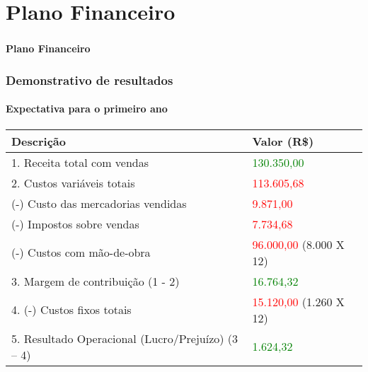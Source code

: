 \documentclass{beamer}
\begin{document}
\section{Plano Financeiro}
\begin{frame}
  \frametitle{}
  \framesubtitle{}

  \begin{center}
    {\huge\textbf{Plano Financeiro}}
  \end{center}
\end{frame}

\begin{frame}
  \frametitle{Demonstrativo de resultados}
  \framesubtitle{Expectativa para o primeiro ano}
  
  \begin{small}
    \begin{tabular}{| l | l |}
      \hline
      \textbf{Descrição} & \textbf{Valor (R\$)}\\ \hline
      1. Receita total com vendas & \textcolor{green}{130.350,00}\\ \hline \hline
      2. Custos variáveis totais & \textcolor{red}{113.605,68}\\ \hline
      (-) Custo das mercadorias vendidas & \textcolor{red}{9.871,00}\\ \hline
      (-) Impostos sobre vendas & \textcolor{red}{7.734,68} \\ \hline
      (-) Custos com mão-de-obra & \textcolor{red}{96.000,00} (8.000 X 12)\\ \hline \hline
      3. Margem de contribuição (1 - 2) & \textcolor{green}{16.764,32}\\ \hline \hline
      4. (-) Custos fixos totais & \textcolor{red}{15.120,00} (1.260 X 12)\\ \hline \hline 
      5. Resultado Operacional (Lucro/Prejuízo) (3 – 4) & \textcolor{green}{1.624,32}\\ \hline
    \end{tabular}
  \end{small}
\end{frame}
\end{document}
